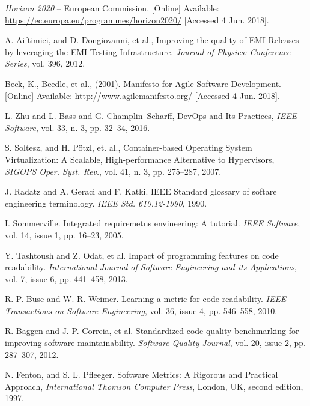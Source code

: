 \documentclass[journal]{IEEEtran}
\begin{document}
\begin{thebibliography}{1}

\emph{Horizon 2020} -- European Commission.
[Online] Available: \url{https://ec.europa.eu/programmes/horizon2020/}
[Accessed 4 Jun. 2018].

A. Aiftimiei, and D. Dongiovanni, et al.,
Improving the quality of EMI Releases by leveraging the
EMI Testing Infrastructure.
\emph{Journal of Physics: Conference Series},
vol. 396, 2012.

Beck, K., Beedle, et al., (2001).
Manifesto for Agile Software Development.
[Online] Available: \url{http://www.agilemanifesto.org/}
[Accessed 4 Jun. 2018].

L. Zhu and L. Bass and G. Champlin--Scharff,
DevOps and Its Practices,
\emph{IEEE Software},
vol. 33, n. 3, pp. 32--34, 2016.

S. Soltesz, and H. P\"{o}tzl, et. al.,
Container-based Operating System Virtualization: A Scalable, High-performance Alternative to Hypervisors,
\emph{SIGOPS Oper. Syst. Rev.},
vol. 41, n. 3, pp. 275--287, 2007.

J. Radatz and A. Geraci and F. Katki.
IEEE Standard glossary of softare engineering terminology.
\emph{IEEE Std. 610.12-1990}, 1990.

I. Sommerville.
Integrated requiremetns envineering: A tutorial.
\emph{IEEE Software},
vol. 14, issue 1, pp. 16--23, 2005.



Y. Tashtoush and Z. Odat, et al.
Impact of programming features on code readability.
\emph{International Journal of Software Engineering and its Applications}, 
vol. 7, issue 6, pp. 441--458, 2013.


R. P. Buse and W. R. Weimer.
Learning a metric for code readability.
\emph{IEEE Transactions on Software Engineering},
vol. 36, issue 4, pp. 546--558, 2010.

R. Baggen and J. P. Correia, et al.
Standardized code quality benchmarking for improving software maintainability.
\emph{Software Quality Journal},
vol. 20, issue 2, pp. 287--307, 2012.







N.  Fenton,  and  S.  L.  Pfleeger.
Software  Metrics:  A  Rigorous  and  Practical Approach,
\emph{International Thomson Computer
Press}, London, UK, second edition, 1997. 


\end{thebibliography}
\end{document}
